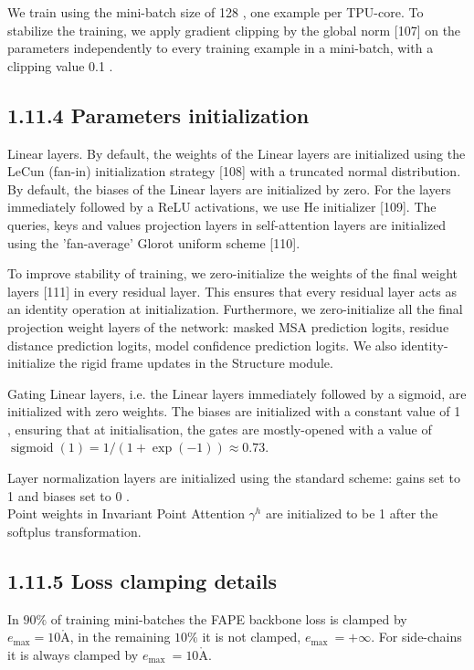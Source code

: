 \documentclass[10pt]{article}
\def\AA{\mathring{\mathrm{A}}}
\begin{document}
We train using the mini-batch size of 128 , one example per TPU-core. To stabilize the training, we apply gradient clipping by the global norm [107] on the parameters independently to every training example in a mini-batch, with a clipping value 0.1 .

\subsection*{1.11.4 Parameters initialization}
Linear layers. By default, the weights of the Linear layers are initialized using the LeCun (fan-in) initialization strategy [108] with a truncated normal distribution. By default, the biases of the Linear layers are initialized by zero. For the layers immediately followed by a ReLU activations, we use He initializer [109]. The queries, keys and values projection layers in self-attention layers are initialized using the 'fan-average' Glorot uniform scheme [110].

To improve stability of training, we zero-initialize the weights of the final weight layers [111] in every residual layer. This ensures that every residual layer acts as an identity operation at initialization. Furthermore, we zero-initialize all the final projection weight layers of the network: masked MSA prediction logits, residue distance prediction logits, model confidence prediction logits. We also identity-initialize the rigid frame updates in the Structure module.

Gating Linear layers, i.e. the Linear layers immediately followed by a sigmoid, are initialized with zero weights. The biases are initialized with a constant value of 1 , ensuring that at initialisation, the gates are mostly-opened with a value of $\operatorname{sigmoid}(1)=1 /(1+\exp (-1)) \approx 0.73$.

Layer normalization layers are initialized using the standard scheme: gains set to 1 and biases set to 0 .\\
Point weights in Invariant Point Attention $\gamma^{h}$ are initialized to be 1 after the softplus transformation.

\subsection*{1.11.5 Loss clamping details}
In $90 \%$ of training mini-batches the FAPE backbone loss is clamped by $e_{\max }=10 \AA$, in the remaining $10 \%$ it is not clamped, $e_{\text {max }}=+\infty$. For side-chains it is always clamped by $e_{\text {max }}=10 \AA$.
\end{document}
